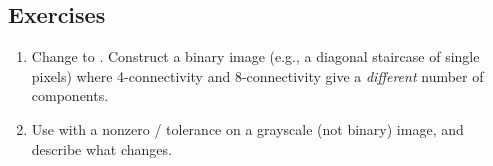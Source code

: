 \subsection*{Exercises}
\begin{enumerate}
  \item Change  to . Construct a binary image (e.g., a diagonal staircase of single pixels) where 4-connectivity and 8-connectivity give a \emph{different} number of components.
  \item Use  with a nonzero / tolerance on a grayscale (not binary) image, and describe what changes.
\end{enumerate}

\vfill
{}
